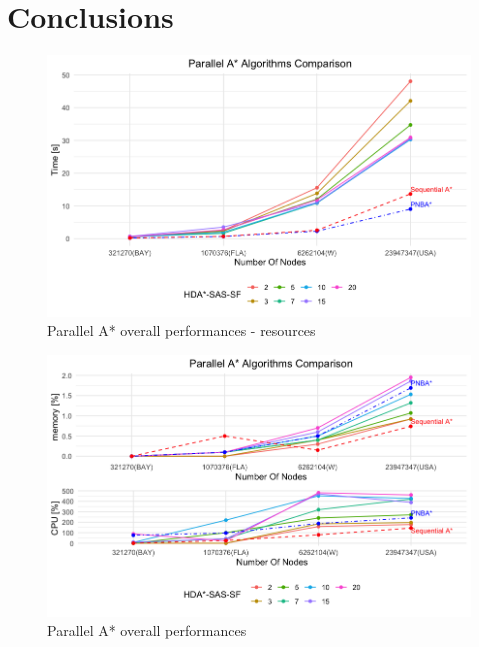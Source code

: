 \documentclass[12pt]{beamer}
\begin{document}
	\section{Conclusions}
	\begin{frame}{\secname}
		\begin{figure}[ht!]
			\centering
			\includegraphics[width=0.85\linewidth]{others/allalgo_time.png}
			\caption{Parallel A* overall performances - resources}
		\end{figure}
	\end{frame}
	\begin{frame}{\secname}
		\begin{figure}[ht!]
			\centering
			\includegraphics[width=0.85\linewidth]{others/allalgo_cpumem.png}
			\caption{Parallel A* overall performances}
		\end{figure}
	\end{frame}
\end{document}
